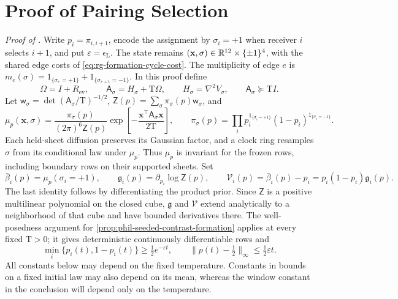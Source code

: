 \section{Proof of Pairing Selection}
\label{sec:phil-pairing-selection-proof}

\noindent\emph{Proof of .}
Write \(p_i=\pi_{i,i+1}\), encode the assignment by
\(\sigma_i=+1\) when receiver \(i\) selects \(i+1\), and put
\(\varepsilon=\epsilon_{\mathrm L}\). The state remains
\((\mathbf x,\sigma)\in\mathbb R^{12}\times\{\pm1\}^4\), with the shared edge
costs of \cref{eq:rg-formation-cycle-cost}. The multiplicity of edge
\(e\) is
\(m_e(\sigma)=1_{\{\sigma_e=+1\}}+1_{\{\sigma_{e+1}=-1\}}\).
In this proof define
\[
 \Omega=I+R_{\mathrm{ev}},\qquad
 \mathsf A_\sigma=H_\sigma+\mathrm T\Omega,\qquad
 H_\sigma=\nabla^2V_\sigma,\qquad
 \mathsf A_\sigma\succeq\mathrm TI.
\]
Let \(\mathsf w_\sigma=\det(\mathsf A_\sigma/\mathrm T)^{-1/2}\),
\(\mathsf Z(p)=\sum_\sigma\pi_\sigma(p)\mathsf w_\sigma\), and
\[
 \mu_p(\mathbf x,\sigma)
 =\frac{\pi_\sigma(p)}{(2\pi)^6\mathsf Z(p)}
   \exp\left[-\frac{\mathbf x^\top\mathsf A_\sigma\mathbf x}
                    {2\mathrm T}\right],\qquad
 \pi_\sigma(p)=\prod_i p_i^{1_{\{\sigma_i=+1\}}}
                         (1-p_i)^{1_{\{\sigma_i=-1\}}}.
\]
Each held-sheet diffusion preserves its Gaussian factor, and a clock ring
resamples \(\sigma\) from its conditional law under \(\mu_p\). Thus
\(\mu_p\) is invariant for the frozen rows, including boundary rows on their
supported sheets. Set
\begin{equation}
 \bar\beta_i(p)=\mu_p(\sigma_i=+1),\qquad
 \mathfrak g_i(p)=\partial_{p_i}\log\mathsf Z(p),\qquad
 \mathscr V_i(p)=\bar\beta_i(p)-p_i
               =p_i(1-p_i)\mathfrak g_i(p).
\label{eq:phil-selection-reduced-field}
\end{equation}
The last identity follows by differentiating the product prior. Since
\(\mathsf Z\) is a positive multilinear polynomial on the closed cube,
\(\mathfrak g\) and \(\mathscr V\) extend analytically to a neighborhood of
that cube and have bounded derivatives there. The well-posedness argument
for \cref{prop:phil-seeded-contrast-formation} applies at every fixed
\(\mathrm T>0\); it gives deterministic continuously differentiable rows and
\begin{equation}
 \min_i\{p_i(t),1-p_i(t)\}\ge\tfrac12e^{-\varepsilon t},\qquad
 \|p(t)-\tfrac12\|_\infty\le\tfrac12\varepsilon t.
\label{eq:phil-selection-row-bounds}
\end{equation}
All constants below may depend on the fixed temperature. Constants in
bounds on a fixed initial law may also depend on its mean, whereas the
window constant in the conclusion will depend only on the temperature.

